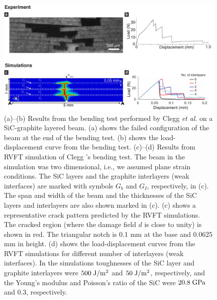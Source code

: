 \documentclass[11pt,letterpaper]{report}
\begin{document}
\begin{enumerate}[label=\textit{2.\arabic*},wide, labelwidth=!, labelindent=0pt]
\begin{figure}[hb!]
	\centering
	\includegraphics[width=\textwidth]{./Figures/CrackPathSim_V1_ver1.pdf}
	\caption{(a)--(b) Results from the bending test performed by Clegg \textit{et al.}\cite{clegg1990simple} on a SiC-graphite layered beam. %
	(a) shows the failed configuration of the beam at the end of the bending test. %
	(b) shows the  load-displacement curve from the bending test. %
	(c)--(d) Results from  RVFT simulation of Clegg 's bending test. %
	The beam in the simulation was two dimensional, i.e., we assumed plane strain conditions. %
	The SiC layers and the graphite interlayers (weak interfaces) are marked with symbols $G_{b}$ and $G_{I}$, respectively, in (c). %
	The span and width of the beam and the thicknesses of the SiC layers and interlayers are also shown marked in (c). %
	(c) shows a representative crack pattern predicted by the RVFT simulations. The cracked region (where the damage field $d$ is close to unity) is shown in red. The triangular notch is 0.1 mm at the base and 0.0625 mm in height. %
	(d) shows the load-displacement curves from the RVFT simulations for different number of interlayers (weak interfaces). %
	In the simulations  toughnesses of the SiC layer and graphite interlayers were $500 \;\rm J/m^2$ and $50 \;\rm J/m^2$, respectively, and the Young's modulus and Poisson's ratio of the SiC were $20.8\;\rm GPa$ and $0.3$, respectively. %
	}
	\label{Fig1}
\end{figure}



\end{enumerate}
\end{document}
